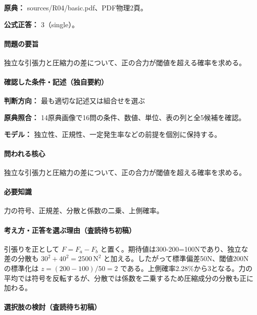 \noindent\textbf{原典：} sources/R04/basic.pdf、PDF物理2頁。

\textbf{公式正答：} 3（single）。

\paragraph{問題の要旨} 独立な引張力と圧縮力の差について、正の合力が閾値を超える確率を求める。

\paragraph{確認した条件・記述（独自要約）}\mbox{}\par

\noindent\textbf{判断方向：} 最も適切な記述又は組合せを選ぶ\par

\noindent\textbf{原典照合：} 14原典画像で16問の条件、数値、単位、表の列と全5候補を確認。\par

\noindent\textbf{モデル：} 独立性、正規性、一定発生率などの前提を個別に保持する。\par

\paragraph{問われる核心} 独立な引張力と圧縮力の差について、正の合力が閾値を超える確率を求める。

\paragraph{必要知識} 力の符号、正規差、分散と係数の二乗、上側確率。

\paragraph{考え方・正答を選ぶ理由（査読待ち初稿）} 引張りを正として \(F=F_a-F_b\) と置く。期待値は300-200=\allowbreak{}100Nであり、独立な差の分散も \(30^2+40^2=2500\,\mathrm{N^2}\) と加える。したがって標準偏差50N、閾値200Nの標準化は \(z=(200-100)/50=2\) である。上側確率2.28\%から3となる。力の平均では符号を反転するが、分散では係数を二乗するため圧縮成分の分散も正に加わる。

\paragraph{選択肢の検討（査読待ち初稿）}\mbox{}\par

